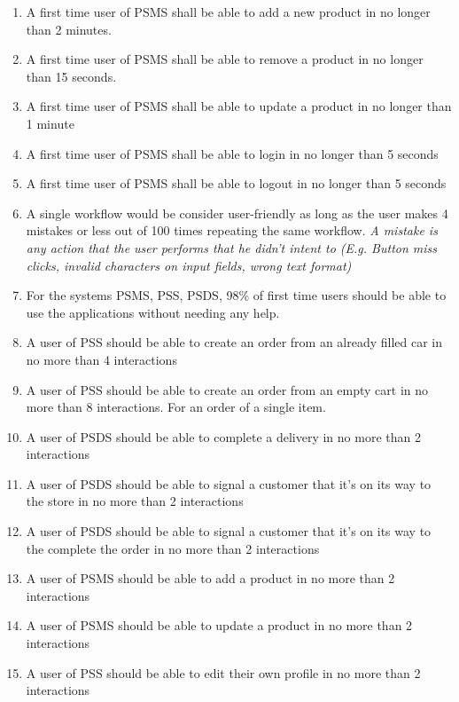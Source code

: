 \begin{enumerate}[label=SEC-\arabic*]
    \item A first time user of PSMS shall be able to add a new product in 
    no longer than 2 minutes.
    \item A first time user of PSMS shall be able to remove a product in 
    no longer than 15 seconds.
    \item A first time user of PSMS shall be able to update a product in 
    no longer than 1 minute
    \item A first time user of PSMS shall be able to login in no longer 
    than 5 seconds
    \item A first time user of PSMS shall be able to logout in no longer 
    than 5 seconds
    \item A single workflow would be consider user-friendly as long as the 
    user makes 4 mistakes or less out of 100 times repeating the same workflow. 
    \textit{A mistake is any action that the user performs that he didn’t 
    intent to (E.g. Button miss clicks, invalid characters on input fields, 
    wrong text format)}
    \item For the systems PSMS, PSS, PSDS, 98\% of first time users should be 
    able to use the applications without needing any help.
    \item A user of PSS should be able to create an order from an already 
    filled car in no more than 4 interactions
    \item A user of PSS should be able to create an order from an empty cart 
    in no more than 8 interactions. For an order of a single item.
    \item A user of PSDS should be able to complete a delivery in no more 
    than 2 interactions
    \item A user of PSDS should be able to signal a customer that it’s on its 
    way to the store in no more than 2 interactions
    \item A user of PSDS should be able to signal a customer that it’s on its
    way to the complete the order in no more than 2 interactions
    \item A user of PSMS should be able to add a product in no more 
    than 2 interactions
    \item A user of PSMS should be able to update a product in no more 
    than 2 interactions
    \item A user of PSS should be able to edit their own profile in no more 
    than 2 interactions
    
\end{enumerate}

